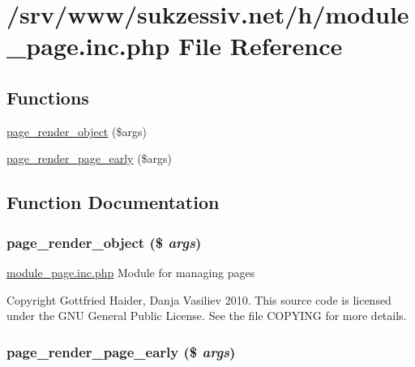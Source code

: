 \hypertarget{module__page_8inc_8php}{
\section{/srv/www/sukzessiv.net/h/module\_\-page.inc.php File Reference}
\label{module__page_8inc_8php}
}
\subsection*{Functions}
\begin{CompactItemize}
\item 
\hyperlink{module__page_8inc_8php_53e7091b9a654d0d772cea6e3127820e}{page\_\-render\_\-object} (\$args)
\item 
\hyperlink{module__page_8inc_8php_80aff2ea069c7a2ba120e26bb218efa5}{page\_\-render\_\-page\_\-early} (\$args)
\end{CompactItemize}


\subsection{Function Documentation}
\hypertarget{module__page_8inc_8php_53e7091b9a654d0d772cea6e3127820e}{
\subsubsection[{page\_\-render\_\-object}]{\setlength{\rightskip}{0pt plus 5cm}page\_\-render\_\-object (\$ {\em args})}}
\label{module__page_8inc_8php_53e7091b9a654d0d772cea6e3127820e}


\hyperlink{module__page_8inc_8php}{module\_\-page.inc.php} Module for managing pages

Copyright Gottfried Haider, Danja Vasiliev 2010. This source code is licensed under the GNU General Public License. See the file COPYING for more details. \hypertarget{module__page_8inc_8php_80aff2ea069c7a2ba120e26bb218efa5}{
\subsubsection[{page\_\-render\_\-page\_\-early}]{\setlength{\rightskip}{0pt plus 5cm}page\_\-render\_\-page\_\-early (\$ {\em args})}}
\label{module__page_8inc_8php_80aff2ea069c7a2ba120e26bb218efa5}


